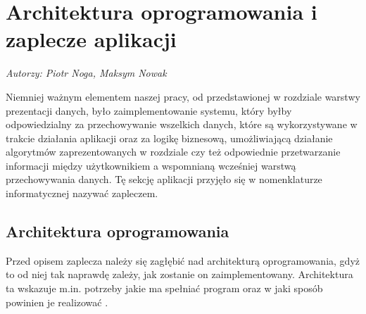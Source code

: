 \chapter{Architektura oprogramowania i zaplecze aplikacji}
\label{chap:ZapleczeAplikacji}
\textit{Autorzy: Piotr Noga, Maksym Nowak}
\par Niemniej ważnym elementem naszej pracy, od przedstawionej w rozdziale  warstwy prezentacji danych, było zaimplementowanie systemu, który byłby odpowiedzialny za przechowywanie wszelkich danych, które są wykorzystywane w trakcie działania aplikacji oraz za logikę biznesową, umożliwiającą działanie algorytmów zaprezentowanych w rozdziale  czy też odpowiednie przetwarzanie informacji między użytkownikiem a wspomnianą wcześniej warstwą przechowywania danych.
Tę sekcję aplikacji przyjęło się w nomenklaturze informatycznej nazywać zapleczem.

\section{Architektura oprogramowania}
\label{sec:ArchitekturaOprogramowania}
Przed opisem zaplecza należy się zagłębić nad architekturą oprogramowania, gdyż to od niej tak naprawdę zależy, jak zostanie on zaimplementowany. Architektura ta wskazuje m.in. potrzeby jakie ma spełniać program oraz w jaki sposób powinien je realizować \cite{AO}.

